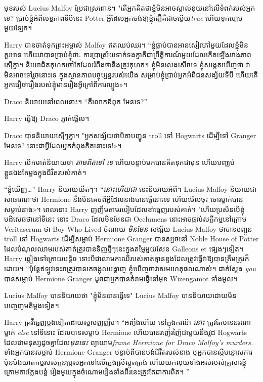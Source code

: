 {មុខរបស់ Lucius Malfoy ប្រែជាស្រពោន។ "តើអ្នកគិតថាខ្ញុំមិនអាចស្គាល់នុយនៅលើទំពក់របស់អ្នកទេ? ប្រាប់ខ្ញុំអំពីលទ្ធភាពទីបីនេះ Potter អ្វីដែលអ្នកចង់ឱ្យខ្ញុំជឿគឺជាចម្លើយ\emph{true} ហើយទុកហ្គេមមួយឡែក។

Harry បានចាត់ទុកព្រះអម្ចាស់ Malfoy ឥតឈប់ឈរ។ “ខ្ញុំធ្លាប់បានអានសៀវភៅមួយដែលខ្ញុំមិនគួរអាន ហើយវាបានប្រាប់ខ្ញុំថាៈ ការប្រាស្រ័យទាក់ទងគ្នាគឺជាព្រឹត្តិការណ៍មួយដែលកើតឡើងរវាងភាពស្មើគ្នា។ និយោជិត​កុហក​ថៅកែ​ដែល​រំពឹង​ថា​នឹង​ត្រូវ​កុហក។ ខ្ញុំមិនលេងសើចទេ ខ្ញុំសង្កេតឃើញថា វាមិនអាចទៅរួចនោះទេ ក្នុងស្ថានភាពបច្ចុប្បន្នរបស់យើង សម្រាប់ខ្ញុំប្រាប់អ្នកអំពីជនសង្ស័យទីបី ហើយតើអ្នកជឿថារឿងរបស់ខ្ញុំមានរឿងអ្វីក្រៅពីការល្បួង»។

Draco និយាយនៅពេលនោះ។ “គឺលោកឪពុក មែនទេ?”

Harry ធ្វើឱ្យ Draco ភ្ញាក់ផ្អើល។

Draco បាននិយាយស្មើៗគ្នា។ "អ្នកសង្ស័យថាបិតាបញ្ជូន troll ទៅ Hogwarts ដើម្បីទៅ Granger មែនទេ? នោះ​ជា​អ្វី​ដែល​អ្នក​កំពុង​គិត​នោះ​ទេ!»។

Harry បើកមាត់និយាយថា \emph{តាមពិតទៅ ទេ} ហើយបន្ទាប់មកបានគិតទុកជាមុន ហើយបញ្ឈប់ខ្លួនឯងតែម្តងក្នុងជីវិតរបស់គាត់។

“ខ្ញុំឃើញ…” Harry និយាយយឺតៗ។ “\emph{នោះហើយជា} នេះនិយាយអំពី។ Lucius Malfoy និយាយជាសាធារណៈថា Hermione នឹងមិនគេចពីអ្វីដែលនាងបានធ្វើនោះទេ ហើយមើលចុះ ចោរម្នាក់បានសម្លាប់នាង»។ ពេលនោះ Harry ញញឹមតាមរបៀបដែលខាំធ្មេញរបស់គាត់។ "ហើយប្រសិនបើខ្ញុំបដិសេធថានៅទីនេះ នោះ Draco ដែលមិនមែនជា Occlumens នោះអាចផ្តល់សក្ខីកម្មនៅក្រោម Veritaserum ថា Boy-Who-Lived ចំណាយ \emph{មិនមែន} សង្ស័យ Lucius Malfoy ថាបានបញ្ជូន troll ទៅ Hogwarts ដើម្បីសម្លាប់ Hermione Granger បានស្បថនៅ Noble House of Potter ដែលបំណុលឈាមរបស់គាត់ត្រូវបានទិញថ្មីៗនេះក្នុងតម្លៃមួយសែន Galleons et ផ្សេងៗទៀត។ Harry ផ្អៀង​ទៅ​ក្រោយ​បន្តិច ទោះ​បី​ជា​លាមក​ឈើ​របស់​គាត់​គ្មាន​ខ្នង​ដែល​ត្រូវ​ធ្វើ​វា​ឱ្យ​បាន​ត្រឹម​ត្រូវ​ក៏​ដោយ។ “ប៉ុន្តែ​ឥឡូវ​នេះ​វា​ត្រូវ​បាន​គេ​ចង្អុល​បង្ហាញ ខ្ញុំ​ឃើញ​ថា​វា​សម​ហេតុ​ផល​ណាស់។ ជាក់ស្តែង \emph{you} បានសម្លាប់ Hermione Granger ដូចជាអ្នកបានគំរាមធ្វើនៅមុខ Wizengamot ទាំងមូល។

Lucius Malfoy បាននិយាយថា "ខ្ញុំមិនបានធ្វើទេ" Lucius Malfoy បាននិយាយដោយមិនបញ្ចេញមតិម្តងទៀត។

Harry គ្រវីធ្មេញម្តងទៀតដោយស្នាមញញឹម។ “អញ្ចឹងហើយ នៅក្នុងករណី \emph{នោះ} ត្រូវតែមាននរណាម្នាក់ \emph{else} នៅទីនោះ ដែលបានសម្លាប់ Hermione ហើយបានរញ៉េរញ៉ៃជាមួយនឹងវួដ Hogwarts ដែលជាមនុស្សដូចគ្នាដែល\emph{មុននេះ} ព្យាយាម\emph {frame Hermione for Draco Malfoy's murders.} ទាំងអ្នកបានសម្លាប់ Hermione Granger បន្ទាប់ពីបានបង់ជីវិតរបស់នាង ឬអ្នកបានស្តីបន្ទោសការប៉ុនប៉ងឃាតកម្មរបស់កូនប្រុសអ្នកទៅលើក្មេងស្រីស្លូតត្រង់ ហើយយកលុយទាំងអស់របស់គ្រួសារខ្ញុំក្រោមការក្លែងបន្លំ រឿងមួយក្នុងចំណោមរឿងទាំងពីរនេះត្រូវតែជាការពិត។ ”

}
